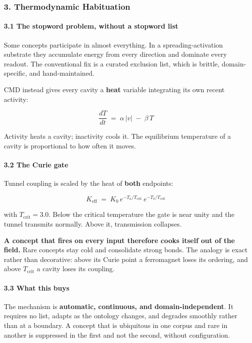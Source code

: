 \documentclass[
  11pt,
  a4paper,
]{article}
\begin{document}
\subsubsection{3. Thermodynamic
Habituation}\label{thermodynamic-habituation}

\paragraph{3.1 The stopword problem, without a stopword
list}\label{the-stopword-problem-without-a-stopword-list}

Some concepts participate in almost everything. In a
spreading-activation substrate they accumulate energy from every
direction and dominate every readout. The conventional fix is a curated
exclusion list, which is brittle, domain-specific, and hand-maintained.

CMD instead gives every cavity a \textbf{heat} variable integrating its
own recent activity:

\[
\frac{dT}{dt} \;=\; \alpha\,|v| \;-\; \beta\,T
\]

Activity heats a cavity; inactivity cools it. The equilibrium
temperature of a cavity is proportional to how often it moves.

\paragraph{3.2 The Curie gate}\label{the-curie-gate}

Tunnel coupling is scaled by the heat of \textbf{both} endpoints:

\[
K_{\text{eff}} \;=\; K_0 \, e^{-T_a / T_{\text{crit}}}\, e^{-T_b / T_{\text{crit}}}
\]

with \(T_{\text{crit}} = 3.0\). Below the critical temperature the gate
is near unity and the tunnel transmits normally. Above it, transmission
collapses.

\textbf{A concept that fires on every input therefore cooks itself out
of the field.} Rare concepts stay cold and consolidate strong bonds. The
analogy is exact rather than decorative: above its Curie point a
ferromagnet loses its ordering, and above \(T_{\text{crit}}\) a cavity
loses its coupling.

\paragraph{3.3 What this buys}\label{what-this-buys}

The mechanism is \textbf{automatic, continuous, and domain-independent}.
It requires no list, adapts as the ontology changes, and degrades
smoothly rather than at a boundary. A concept that is ubiquitous in one
corpus and rare in another is suppressed in the first and not the
second, without configuration.
\end{document}
